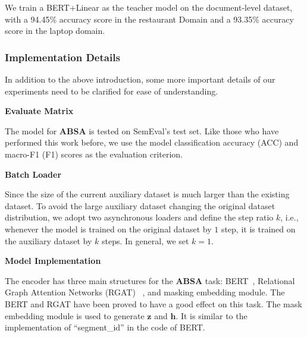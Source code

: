 \documentclass[11pt]{article}
\newcommand{\bz}{\mathbf{z}}
\newcommand{\bh}{\mathbf{h}}
\begin{document}
We train a BERT+Linear as the teacher model on the document-level dataset, with a 94.45\% accuracy score in the restaurant Domain and a 93.35\% accuracy score in the laptop domain.









\subsubsection{Implementation Details}
In addition to the above introduction, some more important details of our experiments need to be clarified for ease of understanding.

\textbf{Evaluate Matrix}

The model for \textbf{ABSA} is tested on SemEval's test set. Like those who have performed this work before, we use the model classification accuracy (ACC) and macro-F1 (F1) scores as the evaluation criterion.



\textbf{Batch Loader}

Since the size of the current auxiliary dataset is much larger than the existing dataset. To avoid the large auxiliary dataset changing the original dataset distribution, we adopt two asynchronous loaders and define the step ratio $k$, i.e., whenever the model is trained on the original dataset by $1$ step, it is trained on the auxiliary dataset by $k$ steps. In general, we set $k=1$.

\textbf{Model Implementation}



The encoder has three main structures for the \textbf{ABSA} task: BERT~\cite{devlin2018bert}, Relational Graph Attention Networks (RGAT) ~\cite{wang2020relational}, and masking embedding module. 
The BERT and RGAT have been proved to have a good effect on this task.
The mask embedding module is used to generate $\bz$ and $\bh$. It is similar to the implementation of ``segment\_id'' in the code of BERT. 
\end{document}
